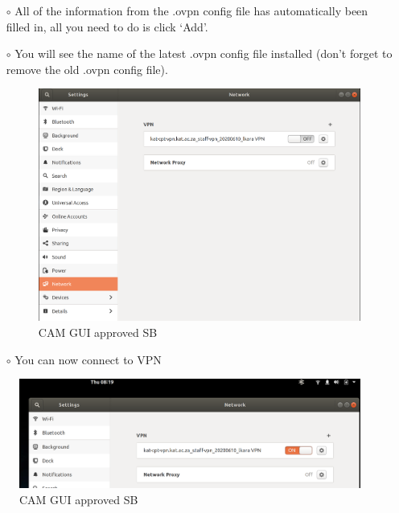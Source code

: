 \begin{itemize}
\begin{itemize}
\item[$\circ$] All of the information from the .ovpn config file has  automatically been filled in, all you need to do is click ‘Add’.

\item[$\circ$] You will see the name of the latest .ovpn config file installed (don't forget to remove the old .ovpn config file).
\begin{figure}[!thb]
	\centering
	\includegraphics[scale=0.25]{Chapters/images/image60.png}
	
	\caption{CAM GUI approved SB }
	\label{fig:image60}
\end{figure}


\item[$\circ$] You can now connect to VPN 
\end{itemize}
\begin{figure}[!thb]
	\centering
	\includegraphics[scale=0.25]{Chapters/images/image101.png}
	
	\caption{CAM GUI approved SB }
	\label{fig:image101}
\end{figure}


\end{itemize}
